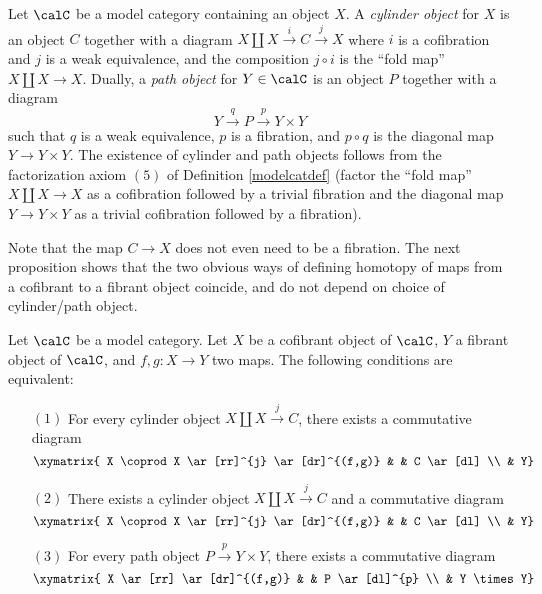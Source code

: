 \begin{Model Categories}
\begin{Already Read}
Let $\calC$ be a model category containing an object $X$. A {\it cylinder object} for $X$
is an object $C$ together with a diagram
$ X \coprod X \stackrel{i}{\rightarrow} C \stackrel{j}{\rightarrow} X$
where $i$ is a cofibration and $j$ is a weak equivalence, and the composition $j \circ i$
is the ``fold map'' $X \coprod X \rightarrow X$. 
Dually, a {\it path object} for $Y \in \calC$ is an object $P$ together with a diagram $$Y \stackrel{q}{\rightarrow} P \stackrel{p}{\rightarrow} Y \times Y$$ such that $q$ is a weak equivalence, $p$ is a fibration, and $p \circ q$ is the diagonal map $Y \rightarrow Y \times Y$.
The existence of cylinder and path objects follows from the factorization axiom $(5)$ of Definition \ref{modelcatdef} (factor the ``fold map'' $X \coprod X \rightarrow X$ as a cofibration followed by a trivial fibration and the diagonal map $Y \rightarrow Y \times Y$ as a trivial cofibration followed by a fibration).
\begin{shaded}
Note that the map $C\to X$ does not even need to be a fibration. The next proposition shows that the two obvious ways of defining homotopy of maps from a cofibrant to a fibrant object coincide, and do not depend on choice of cylinder/path object.
\end{shaded}

\begin{proposition}\label{homotopy}
Let $\calC$ be a model category. Let $X$ be a cofibrant object of $\calC$, $Y$ a fibrant object of $\calC$, and $f,g: X \rightarrow Y$ two maps. The following conditions are equivalent:
\begin{itemize}
\item[$(1)$] For every cylinder object $X \coprod X \stackrel{j}{\rightarrow} C$, there exists a commutative diagram
$$ \xymatrix{ X \coprod X \ar[rr]^{j} \ar[dr]^{(f,g)} & & C \ar[dl] \\
 & Y}$$

\item[$(2)$] There exists a cylinder object $X \coprod X \stackrel{j}{\rightarrow} C$ and a commutative diagram
$$ \xymatrix{ X \coprod X \ar[rr]^{j} \ar[dr]^{(f,g)} & & C \ar[dl] \\
 & Y}$$

\item[$(3)$] For every path object $P \stackrel{p}{\rightarrow} Y \times Y$, there exists a commutative diagram $$ \xymatrix{ X  \ar[rr] \ar[dr]^{(f,g)} & & P \ar[dl]^{p} \\
 & Y \times Y}$$


\end{itemize}
\end{proposition}
\end{Already Read}
\end{Model Categories}
